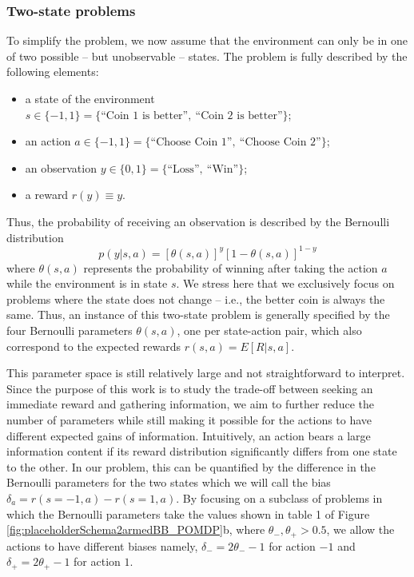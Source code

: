 \documentclass[aps,nofootinbib,groupaddress,superscriptaddress,reprint,amsmath,amssymb,graphicx,onecolumn,prx]{revtex4-2}
\begin{document}
\subsubsection{Two-state problems}
\noindent To simplify the problem, we now assume that the environment can only be in one of two possible -- but unobservable -- states. The problem is fully described by the following elements:
\begin{itemize}
	\item a state of the environment $s\in\{-1,1\} = \{\text{“Coin 1 is better”},\ \text{“Coin 2 is better”} \}$;
	\item an action $a\in\{-1,1\} = \{\text{“Choose Coin 1”},\ \text{“Choose Coin 2”} \}$;
	\item an observation $y\in\{0,1\}= \{\text{“Loss”},\ \text{“Win”} \}$;
	\item a reward $r(y)\equiv y$.
\end{itemize}
Thus, the probability of receiving an observation is described by the Bernoulli distribution
\begin{equation}
    p(y | s, a) = [\theta(s, a)]^y [1-\theta(s,a)]^{1-y}
\end{equation}
where $\theta(s,a)$ represents the probability of winning after taking the action $a$ while the environment is in state $s$. We stress here that we exclusively focus on problems where the state does not change -- i.e., the better coin is always the same. Thus, an instance of this two-state problem is generally specified by the four Bernoulli parameters $\theta(s,a)$, one per state-action pair, which also correspond to the expected rewards $r(s, a) = E[R|s, a]$.

This parameter space is still relatively large and not straightforward to interpret. Since the purpose of this work is to study the trade-off between seeking an immediate reward and gathering information, we aim to further reduce the number of parameters while still making it possible for the actions to have different expected gains of information. Intuitively, an action bears a large information content if its reward distribution significantly differs from one state to the other. In our problem, this can be quantified by the difference in the Bernoulli parameters for the two states which we will call the bias $\delta_a=r(s=-1,a)-r(s=1,a)$. By focusing on a subclass of problems in which the Bernoulli parameters take the values shown in table 1 of Figure \ref{fig:placeholderSchema2armedBB_POMDP}b, where $\theta_-,\theta_+>0.5$, we allow the actions to have different biases namely, $\delta_-=2\theta_- -1$ for action $-1$ and $\delta_+=2\theta_+ -1$ for action $1$. 
\end{document}
